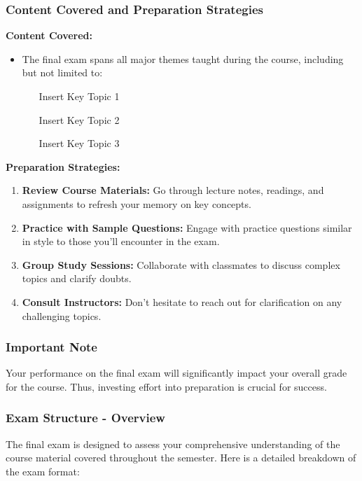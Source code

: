 \documentclass{beamer}
\begin{document}
\begin{frame}[fragile]
    \frametitle{Content Covered and Preparation Strategies}
    \textbf{Content Covered:}
    \begin{itemize}
        \item The final exam spans all major themes taught during the course, including but not limited to:
        \begin{itemize}
            \item [Insert Key Topic 1]
            \item [Insert Key Topic 2]
            \item [Insert Key Topic 3]
        \end{itemize}
    \end{itemize}
    
    \textbf{Preparation Strategies:}
    \begin{enumerate}
        \item \textbf{Review Course Materials:} Go through lecture notes, readings, and assignments to refresh your memory on key concepts.
        \item \textbf{Practice with Sample Questions:} Engage with practice questions similar in style to those you'll encounter in the exam.
        \item \textbf{Group Study Sessions:} Collaborate with classmates to discuss complex topics and clarify doubts.
        \item \textbf{Consult Instructors:} Don't hesitate to reach out for clarification on any challenging topics.
    \end{enumerate}
\end{frame}

\begin{frame}[fragile]
    \frametitle{Important Note}
    Your performance on the final exam will significantly impact your overall grade for the course. Thus, investing effort into preparation is crucial for success.
\end{frame}

\begin{frame}[fragile]
    \frametitle{Exam Structure - Overview}
    The final exam is designed to assess your comprehensive understanding of the course material covered throughout the semester. Here is a detailed breakdown of the exam format:
\end{frame}
\end{document}
